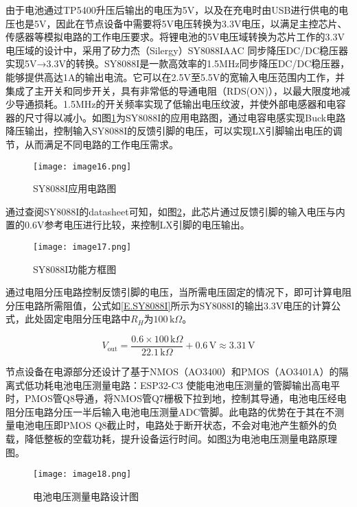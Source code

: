由于电池通过TP5400升压后输出的电压为5V，以及在充电时由USB进行供电的电压也是5V，因此在节点设备中需要将5V电压转换为3.3V电压，以满足主控芯片、传感器等模拟电路的工作电压要求。将锂电池的5V电压域转换为芯片工作的3.3V电压域的设计中，采用了矽力杰（Silergy）SY8088IAAC 同步降压DC/DC稳压器实现5V→3.3V的转换。SY8088I是一款高效率的1.5MHz同步降压DC/DC稳压器，能够提供高达1A的输出电流。它可以在2.5V至5.5V的宽输入电压范围内工作，并集成了主开关和同步开关，具有非常低的导通电阻（RDS(ON)），以最大限度地减少导通损耗。1.5MHz的开关频率实现了低输出电压纹波，并使外部电感器和电容器的尺寸得以减小。如图\ref{F.ECG_image16}为SY8088I的应用电路图，通过电容电感实现Buck电路降压输出，控制输入SY8088I的反馈引脚的电压，可以实现LX引脚输出电压的调节，从而满足不同电路的工作电压需求。

\begin{figure}[hbt]
    \centering
    \texttt{[image: image16.png]}
    \caption{SY8088I应用电路图}
    \label{F.ECG_image16}
\end{figure}

通过查阅SY8088I的datasheet可知，如图\ref{F.ECG_image17}，此芯片通过反馈引脚的输入电压与内置的0.6V参考电压进行比较，来控制LX引脚的电压输出。

\begin{figure}[hbt]
    \centering
    \texttt{[image: image17.png]}
    \caption{SY8088I功能方框图}
    \label{F.ECG_image17}
\end{figure}

通过电阻分压电路控制反馈引脚的电压，当所需电压固定的情况下，即可计算电阻分压电路所需阻值，公式如\ref{E.SY8088I}所示为SY8088I的输出3.3V电压的计算公式，此处固定电阻分压电路中$R_H$为$100\,\text{k}\Omega$。

\begin{equation}
        V_{\text{out}} = \frac{0.6 \times 100\,\text{k}\Omega}{22.1\,\text{k}\Omega} + 0.6\,\text{V} \approx 3.31\,\text{V}
    \label{E.SY8088I}
\end{equation}

节点设备在电源部分还设计了基于NMOS（AO3400）和PMOS（AO3401A）的隔离式低功耗电池电压测量电路：ESP32-C3 使能电池电压测量的管脚输出高电平时，PMOS管Q8导通，将NMOS管Q7栅极下拉到地，控制其导通，电池电压经电阻分压电路分压一半后输入电池电压测量ADC管脚。此电路的优势在于其在不测量电池电压即PMOS Q8截止时，电路处于断开状态，不会对电池产生额外的负载，降低整板的空载功耗，提升设备运行时间。如图\ref{F.ECG_image18}为电池电压测量电路原理图。

\begin{figure}[hbt]
    \centering
    \texttt{[image: image18.png]}
    \caption{电池电压测量电路设计图}
    \label{F.ECG_image18}
\end{figure}

